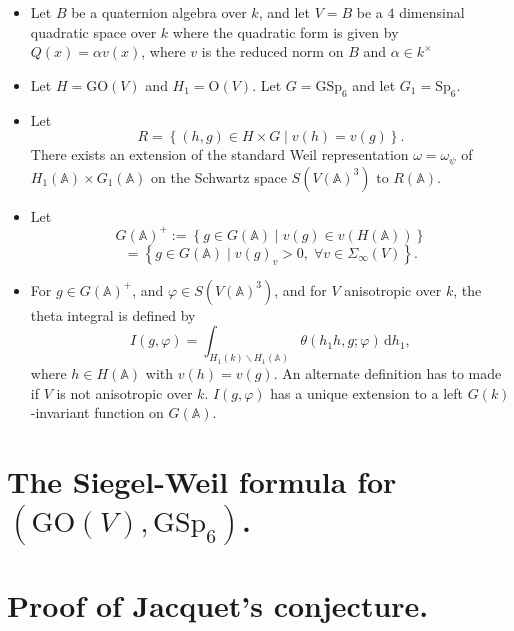 \documentclass[12pt]{article}
\begin{document}
\begin{itemize}
    
\item Let $B$ be a quaternion algebra over $k$, and let $V = B$ be a $4$
dimensinal quadratic space over $k$ where the quadratic form is given by
$Q\left(x\right) = \alpha v\left(x\right)$, where $v$ is the reduced norm on $B$
and $\alpha \in k^{\times}$

\item Let $H = \text{GO}\left(V\right)$ and $H_{1} = \text{O}\left(V\right)$.
Let $G = \text{GSp}_{6}$ and let $G_{1} = \text{Sp}_{6}$.

\item Let 
%
\[R = \left\{\left(h, g\right) \in H \times G \; | \; v\left(h\right) =
v\left(g\right)\right\}.\]
%
There exists an extension of the standard Weil representation $\omega =
\omega_{\psi}$ of $H_{1}\left(\mathbb{A}\right) \times
G_{1}\left(\mathbb{A}\right)$ on the Schwartz space
$S\left(V\left(\mathbb{A}\right)^{3}\right)$ to $R\left(\mathbb{A}\right)$.

\item Let 
%
\[G\left(\mathbb{A}\right)^{+} := \left\{g \in G\left(\mathbb{A}\right) \; | \;
v\left(g\right) \in v\left(H\left(\mathbb{A}\right)\right)\right\}\]
% 
\[= \left\{g \in G\left(\mathbb{A}\right) \; | \; v\left(g\right)_{v} > 0, \;
\forall v \in \Sigma_{\infty}\left(V\right)\right\}.\]
%
\item For $g \in G\left(\mathbb{A}\right)^{+}$, and $\varphi \in
S\left(V\left(\mathbb{A}\right)^{3}\right)$, and for $V$ anisotropic over $k$,
the theta integral is defined by 
%
\[I\left(g, \varphi\right) = \int_{H_{1}\left(k\right) \backslash
H_{1}\left(\mathbb{A}\right)}^{} \theta\left(h_1h, g; \varphi\right) \,
\mathrm{d}h_{1},\]
%
where $h \in H\left(\mathbb{A}\right)$ with $v\left(h\right) = v\left(g\right)$.
An alternate definition has to made if $V$ is not anisotropic over $k$.
$I\left(g, \varphi\right)$ has a unique extension to a left
$G\left(k\right)$-invariant function on $G\left(\mathbb{A}\right)$.

\end{itemize}

\section{The Siegel-Weil formula for $\left(\text{GO}\left(V\right),
\text{GSp}_{6}\right)$.}

\section{Proof of Jacquet's conjecture.}
\end{document}
